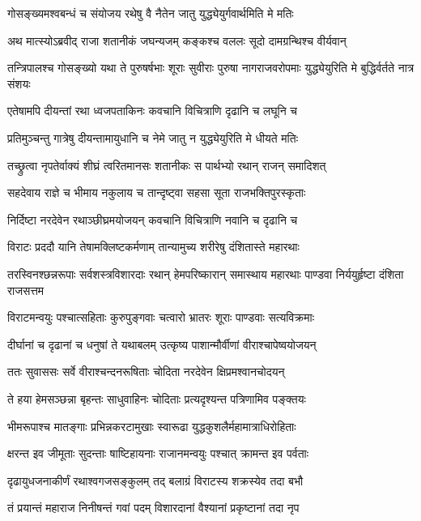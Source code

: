 \twolineshloka
{गोसङ्ख्यमश्वबन्धं च संयोजय रथेषु वै}
{नैतेन जातु युद्ध्येयुर्गवार्थमिति मे मतिः}



\twolineshloka
{अथ मात्स्योऽब्रवीद् राजा शतानीकं जघन्यजम्}
{कङ्कश्च वललः सूदो दामग्रन्थिश्च वीर्यवान्}


\threelineshloka
{तन्त्रिपालश्च गोसङ्ख्यो यथा ते पुरुषर्षभाः}
{शूराः सुवीराः पुरुषा नागराजवरोपमाः}
{युद्ध्येयुरिति मे बुद्धिर्वर्तते नात्र संशयः}


\twolineshloka
{एतेषामपि दीयन्तां रथा ध्वजपताकिनः}
{कवचानि विचित्राणि दृढानि च लघूनि च}


\twolineshloka
{प्रतिमुञ्चन्तु गात्रेषु दीयन्तामायुधानि च}
{नेमे जातु न युद्ध्येयुरिति मे धीयते मतिः}



\twolineshloka
{तच्छ्रुत्वा नृपतेर्वाक्यं शीघ्रं त्वरितमानसः}
{शतानीकः स पार्थभ्यो रथान् राजन् समादिशत्}


\twolineshloka
{सहदेवाय राज्ञे च भीमाय नकुलाय च}
{तान्दृष्ट्वा सहसा सूता राजभक्तिपुरस्कृताः}


\twolineshloka
{निर्दिष्टा नरदेवेन रथाञ्छीघ्रमयोजयन्}
{कवचानि विचित्राणि नवानि च दृढानि च}


\twolineshloka
{विराटः प्रददौ यानि तेषामक्लिष्टकर्मणाम्}
{तान्यामुच्य शरीरेषु दंशितास्ते महारथाः}


\threelineshloka
{तरस्विनश्छन्नरूपाः सर्वशस्त्रविशारदाः}
{रथान् हेमपरिष्कारान् समास्थाय महारथाः}
{पाण्डवा निर्ययुर्हृष्टा दंशिता राजसत्तम}


\twolineshloka
{विराटमन्वयुः पश्चात्सहिताः कुरुपुङ्गवाः}
{चत्वारो भ्रातरः शूराः पाण्डवाः सत्यविक्रमाः}


\twolineshloka
{दीर्घानां च दृढानां च धनुषां ते यथाबलम्}
{उत्कृष्य पाशान्मौर्वीणां वीराश्चापेष्वयोजयन्}


\twolineshloka
{ततः सुवाससः सर्वे वीराश्चन्दनरूषिताः}
{चोदिता नरदेवेन क्षिप्रमश्वानचोदयन्}


\twolineshloka
{ते हया हेमसञ्छन्ना बृहन्तः साधुवाहिनः}
{चोदिताः प्रत्यदृश्यन्त पत्रिणामिव पङ्क्तयः}


\twolineshloka
{भीमरूपाश्च मातङ्गाः प्रभिन्नकरटामुखाः}
{स्वारूढा युद्धकुशलैर्महामात्राधिरोहिताः}


\twolineshloka
{क्षरन्त इव जीमूताः सुदन्ताः षाष्टिहायनाः}
{राजानमन्वयुः पश्चात् क्रामन्त इव पर्वताः}


\twolineshloka
{दृढायुधजनाकीर्णं रथाश्वगजसङ्कुलम्}
{तद् बलाग्रं विराटस्य शक्रस्येव तदा बभौ}


\twolineshloka
{तं प्रयान्तं महाराज निनीषन्तं गवां पदम्}
{विशारदानां वैश्यानां प्रकृष्टानां तदा नृप}


